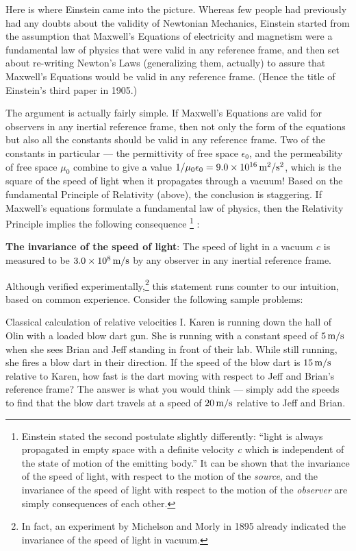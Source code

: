 Here is where Einstein came into the picture.  Whereas few people had
previously had any doubts about the validity of Newtonian Mechanics,
Einstein started from the assumption that Maxwell's Equations of
electricity and magnetism were a fundamental law of physics that were
valid in any reference frame, and then set about re-writing Newton's
Laws (generalizing them, actually) to assure that Maxwell's Equations
would be valid in any reference frame.  (Hence the title of Einstein's
third paper in 1905.)
   
The argument is actually fairly simple.  If Maxwell's Equations are
valid for observers in any inertial reference frame, then not only the
form of the equations but also all the constants should be valid in any
reference frame.  Two of the constants in particular --- the
permittivity of free space $\epsilon_0$, and the permeability of free
space $\mu_0$ combine to give a value $1/\mu_0\epsilon_0 = 9.0\times
10^{16}\,\mbox{m$^2$/s$^2$}$, which is the square of the speed of
light when it propagates through a vacuum!  Based on the fundamental
Principle of Relativity (above), the conclusion is staggering.  If
Maxwell's equations formulate a fundamental law of physics, then the
Relativity Principle implies the following consequence
\footnote{Einstein stated the second postulate slightly differently:  
``light is always propagated in empty space with a definite velocity
{\em c} which is independent of the state of motion of the emitting
body.''  It can be shown that the invariance of the speed of light, 
with respect to the motion of the {\em source}, and the invariance of the 
speed of light with respect to the motion of the {\em observer}
are simply consequences of each other.}
:

\begin{boxittext}
{
{\bf The invariance of the speed of light}: The speed of light in a vacuum $c$
is measured to be $3.0\times 10^8\,\mbox{m/s}$ by any observer in any inertial
reference frame.
}
\end{boxittext}
   
\noindent Although verified experimentally,\footnote{In fact, an
  experiment by Michelson and Morly in 1895 already indicated the
  invariance of the speed of light in vacuum.} this statement runs
counter to our intuition, based on common experience.  Consider the
following sample problems:

\begin{example}{Classical calculation of relative velocities I.}
  Karen is running down the hall of Olin with a loaded blow dart gun.
  She is running with a constant speed of $5\,\mbox{m/s}$ when she sees Brian
  and Jeff standing in front of their lab. While still running, she
  fires a blow dart in their direction.  If the speed of the blow dart
  is $15\,\mbox{m/s}$ relative to Karen, how fast is the dart moving with
  respect to
  Jeff and Brian's reference frame?  \solution The answer is what you
  would think --- simply add the speeds to find that the blow dart
  travels at a speed of $20\,\mbox{m/s}$ relative to Jeff and Brian.
\end{example}

